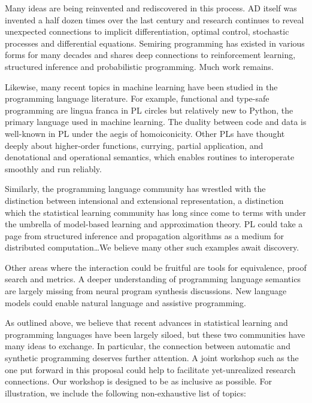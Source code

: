 \documentclass{article}
\begin{document}
    Many ideas are being reinvented and rediscovered in this process. AD itself was invented a half dozen times over the last century and research continues to reveal unexpected connections to implicit differentiation, optimal control, stochastic processes and differential equations. Semiring programming has existed in various forms for many decades and shares deep connections to reinforcement learning, structured inference and probabilistic programming. Much work remains.

    Likewise, many recent topics in machine learning have been studied in the programming language literature. For example, functional and type-safe programming are lingua franca in PL circles but relatively new to Python, the primary language used in machine learning. The duality between code and data is well-known in PL under the aegis of homoiconicity. Other PLs have thought deeply about higher-order functions, currying, partial application, and denotational and operational semantics, which enables routines to interoperate smoothly and run reliably.

    Similarly, the programming language community has wrestled with the distinction between intensional and extensional representation, a distinction which the statistical learning community has long since come to terms with under the umbrella of model-based learning and approximation theory. PL could take a page from structured inference and propagation algorithms as a medium for distributed computation\ldots We believe many other such examples await discovery.

    Other areas where the interaction could be fruitful are tools for equivalence, proof search and metrics. A deeper understanding of programming language semantics are largely missing from neural program synthesis discussions. New language models could enable natural language and assistive programming.

    As outlined above, we believe that recent advances in statistical learning and programming languages have been largely siloed, but these two communities have many ideas to exchange. In particular, the connection between automatic and synthetic programming deserves further attention. A joint workshop such as the one put forward in this proposal could help to facilitate yet-unrealized research connections. Our workshop is designed to be as inclusive as possible. For illustration, we include the following non-exhaustive list of topics:
\end{document}
